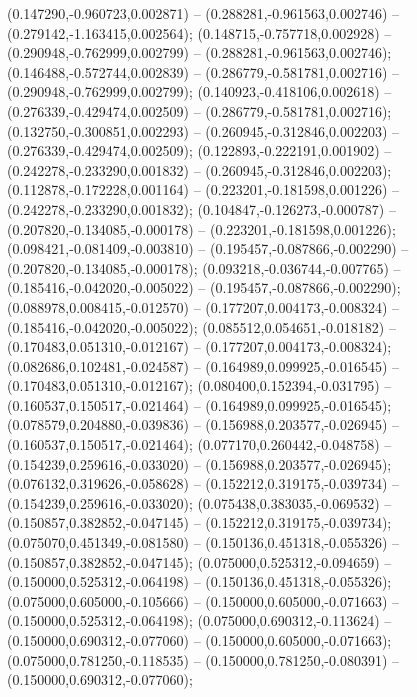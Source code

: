  (0.147290,-0.960723,0.002871) -- (0.288281,-0.961563,0.002746) -- (0.279142,-1.163415,0.002564);
 (0.148715,-0.757718,0.002928) -- (0.290948,-0.762999,0.002799) -- (0.288281,-0.961563,0.002746);
 (0.146488,-0.572744,0.002839) -- (0.286779,-0.581781,0.002716) -- (0.290948,-0.762999,0.002799);
 (0.140923,-0.418106,0.002618) -- (0.276339,-0.429474,0.002509) -- (0.286779,-0.581781,0.002716);
 (0.132750,-0.300851,0.002293) -- (0.260945,-0.312846,0.002203) -- (0.276339,-0.429474,0.002509);
 (0.122893,-0.222191,0.001902) -- (0.242278,-0.233290,0.001832) -- (0.260945,-0.312846,0.002203);
 (0.112878,-0.172228,0.001164) -- (0.223201,-0.181598,0.001226) -- (0.242278,-0.233290,0.001832);
 (0.104847,-0.126273,-0.000787) -- (0.207820,-0.134085,-0.000178) -- (0.223201,-0.181598,0.001226);
 (0.098421,-0.081409,-0.003810) -- (0.195457,-0.087866,-0.002290) -- (0.207820,-0.134085,-0.000178);
 (0.093218,-0.036744,-0.007765) -- (0.185416,-0.042020,-0.005022) -- (0.195457,-0.087866,-0.002290);
 (0.088978,0.008415,-0.012570) -- (0.177207,0.004173,-0.008324) -- (0.185416,-0.042020,-0.005022);
 (0.085512,0.054651,-0.018182) -- (0.170483,0.051310,-0.012167) -- (0.177207,0.004173,-0.008324);
 (0.082686,0.102481,-0.024587) -- (0.164989,0.099925,-0.016545) -- (0.170483,0.051310,-0.012167);
 (0.080400,0.152394,-0.031795) -- (0.160537,0.150517,-0.021464) -- (0.164989,0.099925,-0.016545);
 (0.078579,0.204880,-0.039836) -- (0.156988,0.203577,-0.026945) -- (0.160537,0.150517,-0.021464);
 (0.077170,0.260442,-0.048758) -- (0.154239,0.259616,-0.033020) -- (0.156988,0.203577,-0.026945);
 (0.076132,0.319626,-0.058628) -- (0.152212,0.319175,-0.039734) -- (0.154239,0.259616,-0.033020);
 (0.075438,0.383035,-0.069532) -- (0.150857,0.382852,-0.047145) -- (0.152212,0.319175,-0.039734);
 (0.075070,0.451349,-0.081580) -- (0.150136,0.451318,-0.055326) -- (0.150857,0.382852,-0.047145);
 (0.075000,0.525312,-0.094659) -- (0.150000,0.525312,-0.064198) -- (0.150136,0.451318,-0.055326);
 (0.075000,0.605000,-0.105666) -- (0.150000,0.605000,-0.071663) -- (0.150000,0.525312,-0.064198);
 (0.075000,0.690312,-0.113624) -- (0.150000,0.690312,-0.077060) -- (0.150000,0.605000,-0.071663);
 (0.075000,0.781250,-0.118535) -- (0.150000,0.781250,-0.080391) -- (0.150000,0.690312,-0.077060);
